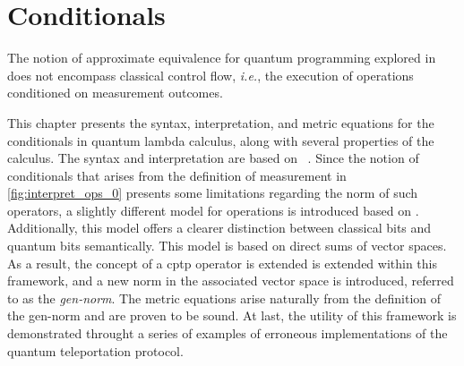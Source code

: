 \chapter{Conditionals}

The notion of approximate equivalence for quantum programming explored in \cite{dahlqvist2022syntactic} does not encompass classical control flow, \textit{i.e.}, the execution of operations conditioned on measurement outcomes. 

This chapter presents the syntax, interpretation, and metric equations for the conditionals in quantum lambda calculus, along with several properties of the calculus. The syntax and interpretation are based on  \cite{crole1993categories,selinger2013lecture,selinger2009quantum}. Since the notion of conditionals that arises from the definition of measurement in \autoref{fig:interpret_ops_0} presents some limitations regarding the norm of such operators, a slightly different model for operations is introduced based on \cite{selinger2004towards}. Additionally, this model offers a clearer distinction between classical bits and quantum bits semantically. This model is based on direct sums of vector spaces. As a result, the concept of a \acrshort{cptp} operator is extended is extended within this framework, and a new norm in the associated vector space is introduced, referred to as the \emph{gen-norm}. The metric equations arise naturally from the definition of the gen-norm and are proven to be sound. At last, the utility of this framework is demonstrated throught a series of examples of erroneous implementations of the quantum teleportation protocol.









